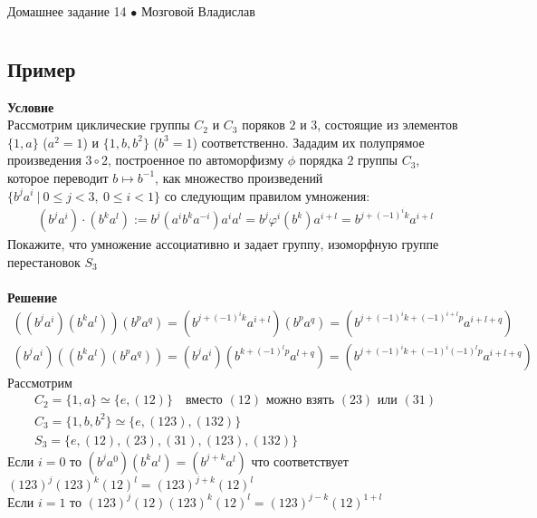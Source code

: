 
\newpage
	{\large \hspace{3cm} \begin{center} Домашнее задание 14 $\bullet$ Мозговой Владислав \end{center} }
	\vspace{-1.5ex}
	\hrulefill
	
	\fontsize{12pt}{4.5mm}\selectfont
	\vspace{-3ex}
	\hrulefill
	\newline

	\section{}
		\subsection*{Пример}
		\textbf{Условие}\\
		Рассмотрим циклические группы $C_2$ и $C_3$ поряков $2$ и $3$, состоящие из элементов $\{1, a\}$ ($a^2 = 1$) и $\{1, b, b^2\}$ ($b^3 = 1$) соответственно. Зададим их полупрямое произведения $3 \circ 2$, построенное по автоморфизму $\phi$ порядка $2$ группы $C_3$, которое переводит $b \mapsto b^{-1}$, как множество произведений $\{b^j a^i\: |\: 0 \leqslant j < 3,\: 0 \leqslant i < 1\}$ со следующим правилом умножения: 
		\begin{gather*}
			(b^{j} a^{i}) \cdot(b^{k} a^{l}):=b^{j}(a^{i} b^{k} a^{-i}) a^{i} a^{l}=b^{j} \varphi^{i}(b^{k}) a^{i+l}=b^{j+(-1)^{i} k} a^{i+l}
		\end{gather*}
		Покажите, что умножение ассоциативно и задает группу, изоморфную группе перестановок $S_3$\\
		\\
		\textbf{Решение}\\
		\begin{gather*}
			((b^{j} a^{i})(b^{k} a^{l}))(b^{p} a^{q}) = (b^{j + (-1)^{i}k} a^{i+l})(b^{p} a^{q}) = (b^{j + (-1)^{i}k + (-1)^{i+l}p} a^{i+l+q})\\
			(b^{j} a^{i})((b^{k} a^{l})(b^{p} a^{q})) = (b^{j} a^{i})(b^{k + (-1)^{l}p} a^{l + q}) = (b^{j + (-1)^{i}k + (-1)^{i}(-1)^{l}p} a^{i+l+q})
		\end{gather*}
		Рассмотрим 
		\begin{gather*}
			C_2 = \{1, a\} \simeq \{e, (12)\}\quad \text{вместо $(12)$ можно взять $(23)$ или $(31)$}\\
			C_3 = \{1, b, b^2\} \simeq \{e, (123), (132)\}\\
			S_3 = \{e, (12), (23), (31), (123), (132)\}			
		\end{gather*}
		Если $i = 0$ то $(b^{j} a^{0})(b^{k} a^{l}) = (b^{j + k} a^{l})$ что соответствует $(123)^{j} (123)^{k} (12)^{l} = (123)^{j+k} (12)^{l}$\\
		Если $i = 1$ то $(123)^{j} (12) (123)^{k} (12)^{l} = (123)^{j-k} (12)^{1 + l}$
		
